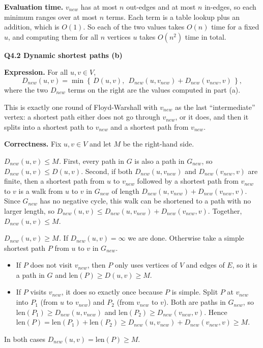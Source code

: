 \documentclass[11pt]{article}
\newcommand{\set}[1]{\left\{#1\right\}}
\newcommand{\qpage}[1]{\clearpage\noindent\textbf{\large #1}\par\medskip}
\begin{document}
\textbf{Evaluation time.}
$v_{new}$ has at most $n$ out-edges and at most $n$ in-edges, so each minimum ranges over at most $n$ terms.
Each term is a table lookup plus an addition, which is $O(1)$.
So each of the two values takes $O(n)$ time for a fixed $u$, and computing them for all $n$ vertices $u$ takes $O(n^2)$ time in total.
    

\qpage{Q4.2 Dynamic shortest paths (b)}

\textbf{Expression.}
For all $u,v \in V$,
\[
  D_{new}(u,v) = \min\set{\, D(u,v),\ \ D_{new}(u,v_{new}) + D_{new}(v_{new},v) \,},
\]
where the two $D_{new}$ terms on the right are the values computed in part (a).

This is exactly one round of Floyd-Warshall with $v_{new}$ as the last ``intermediate'' vertex: a shortest path either does not go through $v_{new}$, or it does, and then it splits into a shortest path to $v_{new}$ and a shortest path from $v_{new}$.

\textbf{Correctness.}
Fix $u,v \in V$ and let $M$ be the right-hand side.

\emph{$D_{new}(u,v) \le M$.}
First, every path in $G$ is also a path in $G_{new}$, so $D_{new}(u,v) \le D(u,v)$.
Second, if both $D_{new}(u,v_{new})$ and $D_{new}(v_{new},v)$ are finite, then a shortest path from $u$ to $v_{new}$ followed by a shortest path from $v_{new}$ to $v$ is a walk from $u$ to $v$ in $G_{new}$ of length $D_{new}(u,v_{new}) + D_{new}(v_{new},v)$.
Since $G_{new}$ has no negative cycle, this walk can be shortened to a path with no larger length, so $D_{new}(u,v) \le D_{new}(u,v_{new}) + D_{new}(v_{new},v)$.
Together, $D_{new}(u,v) \le M$.

\emph{$D_{new}(u,v) \ge M$.}
If $D_{new}(u,v) = \infty$ we are done.
Otherwise take a simple shortest path $P$ from $u$ to $v$ in $G_{new}$.
\begin{itemize}
  \item If $P$ does not visit $v_{new}$, then $P$ only uses vertices of $V$ and edges of $E$, so it is a path in $G$ and $\text{len}(P) \ge D(u,v) \ge M$.
  \item If $P$ visits $v_{new}$, it does so exactly once because $P$ is simple.
  Split $P$ at $v_{new}$ into $P_1$ (from $u$ to $v_{new}$) and $P_2$ (from $v_{new}$ to $v$).
  Both are paths in $G_{new}$, so $\text{len}(P_1) \ge D_{new}(u,v_{new})$ and $\text{len}(P_2) \ge D_{new}(v_{new},v)$.
  Hence $\text{len}(P) = \text{len}(P_1) + \text{len}(P_2) \ge D_{new}(u,v_{new}) + D_{new}(v_{new},v) \ge M$.
\end{itemize}
In both cases $D_{new}(u,v) = \text{len}(P) \ge M$.
\end{document}
